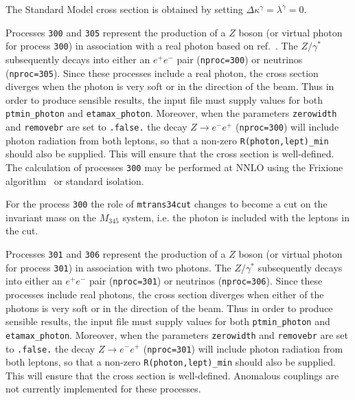 The Standard Model cross section is obtained by setting $\Delta\kappa^\gamma = \lambda^\gamma = 0$.

\label{subsec:zgamma}


Processes {\tt 300} and {\tt 305} represent the production of a $Z$ boson (or virtual photon for process {\tt 300})
in association with a real photon based on ref.~\cite{Campbell:2017aul}. The $Z/\gamma^*$ subsequently decays into 
either an $e^+ e^-$ pair ({\tt nproc=300}) or neutrinos ({\tt nproc=305}).
Since these processes include a real photon, the cross section diverges
when the photon is very soft or in the direction of the beam.
Thus in order to produce sensible results, the input file must supply values for both
{\tt ptmin\_photon} and {\tt etamax\_photon}. Moreover, when the parameters {\tt zerowidth}
and {\tt removebr} are set to {\tt .false.} the decay $Z \to e^- e^+$ ({\tt nproc=300})
will include photon radiation from both leptons, so that a non-zero {\tt R(photon,lept)\_min}
should also be supplied. This will ensure that the cross section is well-defined.
The calculation of processes {\tt 300} may be performed
at NNLO using the Frixione algorithm~\cite{Frixione:1998jh} or standard isolation. 

For the process {\tt 300}  the role of {\tt mtrans34cut} changes to become a cut 
on the invariant mass on the $M_{345}$ system, i.e. the photon is included with the leptons in the cut. 




Processes {\tt{301}} and {\tt{306}} represent the production of a $Z$ boson 
(or virtual photon for process {\tt 301}) in association with two photons.   The $Z/\gamma^*$ subsequently decays into 
either an $e^+ e^-$ pair ({\tt nproc=301}) or neutrinos ({\tt nproc=306}).
Since these processes include real photons, the cross section diverges
when either of the photons is very soft or in the direction of the beam.
Thus in order to produce sensible results, the input file must supply values for both
{\tt ptmin\_photon} and {\tt etamax\_photon}. Moreover, when the parameters {\tt zerowidth}
and {\tt removebr} are set to {\tt .false.} the decay $Z \to e^- e^+$ ({\tt nproc=301})
will include photon radiation from both leptons, so that a non-zero {\tt R(photon,lept)\_min}
should also be supplied. This will ensure that the cross section is well-defined.
Anomalous couplings are not currently implemented for these processes. 

